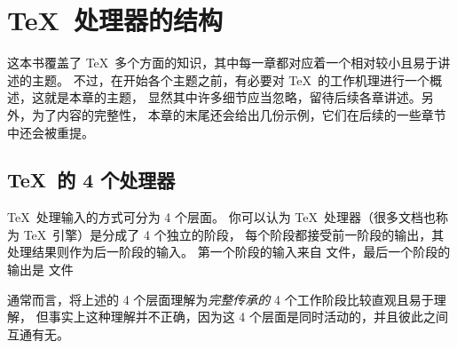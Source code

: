 \documentclass{book}
\begin{document}
\chapter{\TeX\ 处理器的结构}

这本书覆盖了 \TeX\ 多个方面的知识，其中每一章都对应着一个相对较小且易于讲述的主题。
不过，在开始各个主题之前，有必要对 \TeX\ 的工作机理进行一个概述，这就是本章的主题，
显然其中许多细节应当忽略，留待后续各章讲述。另外，为了内容的完整性，
本章的末尾还会给出几份示例，它们在后续的一些章节中还会被重提。

\section{\TeX\ 的 4 个处理器}

\TeX\ 处理输入的方式可分为 4 个层面。
你可以认为 \TeX\ 处理器（很多文档也称为 \TeX\ 引擎）是分成了 4 个独立的阶段，
每个阶段都接受前一阶段的输出，其处理结果则作为后一阶段的输入。
第一个阶段的输入来自  文件，最后一个阶段的输出是  文件%

通常而言，将上述的 4 个层面理解为{\em 完整传承的} 4 个工作阶段比较直观且易于理解，
但事实上这种理解并不正确，因为这 4 个层面是同时活动的，并且彼此之间互通有无。
\end{document}
